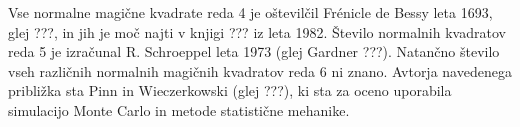 \documentclass[a4paper,12pt]{article}
\begin{document}
Vse normalne magične kvadrate reda 4 je oštevilčil Frénicle de Bessy
leta 1693, glej ???, in jih je moč najti v knjigi ???
iz leta 1982. Število normalnih kvadratov reda 5 je izračunal
R. Schroeppel leta 1973 (glej Gardner ???).
Natančno število vseh različnih normalnih magičnih kvadratov reda 6 ni znano.
Avtorja navedenega približka sta Pinn in Wieczerkowski (glej ???), ki
sta za oceno uporabila simulacijo Monte Carlo in metode statistične mehanike.


\newpage


\end{document}
